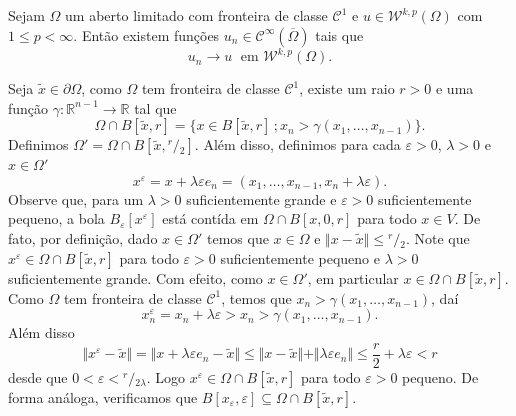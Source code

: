\documentclass[a4paper, 11pt]{book}
\theoremstyle{definition}
\newcommand{\bR}{\mathbb{R}}
\newcommand{\cC}{\mathcal{C}}
\newcommand{\cW}{\mathcal{W}}
\newcommand{\sfrac}[2]{{}^{#1}\!\!/\!_{#2}}
\begin{document}
\begin{tbox}
    Sejam $\Omega$ um aberto limitado com fronteira de classe $\cC^1$ e $u \in \cW^{k,p}(\Omega)$ com $1 \leqslant p < \infty$.
    Então existem funções $u_n \in \cC^\infty(\overline\Omega)$ tais que
    \[
        u_n \to u \;\text{ em } \cW^{k,p}(\Omega).
    \]
\end{tbox}
\begin{prf}
    Seja $\tilde x \in \partial \Omega$, como $\Omega$ tem fronteira de classe $\cC^1$, existe um raio $r > 0$ e uma função $\gamma : \bR^{n-1} \to \bR$ tal que
    \[
        \Omega \cap B[\tilde x, r] = \{x \in B[\tilde x, r] \,; x_n > \gamma(x_1,\dots,x_{n-1})\}.
    \]
    Definimos $\Omega' = \Omega \cap B[\tilde x, \sfrac{r}{2}]$.
    Além disso, definimos para cada $\varepsilon > 0$, $\lambda > 0$ e $x \in \Omega'$
    \[
        x^\varepsilon = x + \lambda \varepsilon e_n = (x_1,\dots,x_{n-1}, x_n + \lambda\varepsilon).
    \]
    Observe que, para um $\lambda > 0$ suficientemente grande e $\varepsilon > 0$ suficientemente pequeno, a bola $B_\varepsilon[x^\varepsilon]$ está contída em $\Omega \cap B[x,0,r]$ para todo $x \in V$.
    De fato, por definição, dado $x \in \Omega'$ temos que $x \in \Omega$ e $\Vert x - \tilde x \Vert \leqslant \sfrac{r}{2}$.
    Note que $x^\varepsilon \in \Omega \cap B[\tilde x, r]$ para todo $\varepsilon > 0$ suficientemente pequeno e $\lambda > 0$ suficientemente grande.
    Com efeito, como $x \in \Omega'$, em particular $x \in \Omega \cap B[\tilde x, r]$.
    Como $\Omega$ tem fronteira de classe $\cC^1$, temos que $x_n > \gamma(x_1,\dots,x_{n-1})$, daí
    \[
        x^\varepsilon_n = x_n + \lambda \varepsilon > x_n >  \gamma(x_{1},\dots,x_{n-1}).
    \]
    Além disso
    \[
        \Vert x^\varepsilon - \tilde x \Vert = \Vert x + \lambda \varepsilon e_n - \tilde x \Vert \leqslant \Vert x - \tilde x \Vert + \Vert \lambda \varepsilon e_n  \Vert \leqslant \frac{r}{2} + \lambda\varepsilon < r
    \]
    desde que $0 <\varepsilon < \sfrac{r}{2\lambda}$.
    Logo $x^\varepsilon \in \Omega \cap B[\tilde x, r]$ para todo $\varepsilon > 0$ pequeno.
    De forma análoga, verificamos que
    $B[x_\varepsilon, \varepsilon] \subseteq \Omega \cap B[\tilde x,r]$.


\end{prf}
\end{document}
